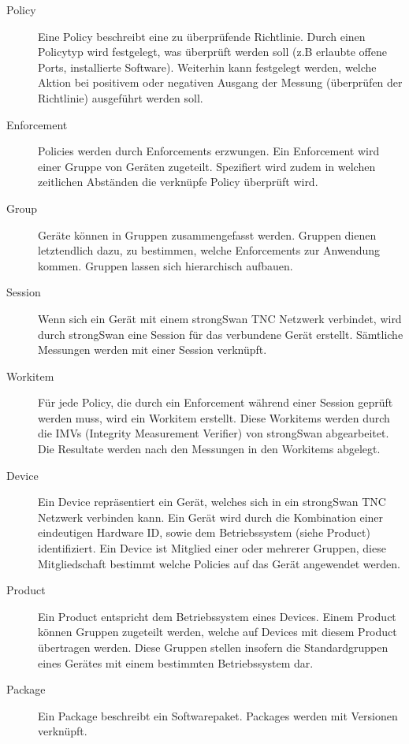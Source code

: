 \begin{description}
	\item[Policy] Eine Policy beschreibt eine zu überprüfende Richtlinie. Durch
	einen Policytyp wird festgelegt, was überprüft werden soll (z.B erlaubte offene
	Ports, installierte Software). Weiterhin kann festgelegt werden, welche Aktion
	bei positivem oder negativen Ausgang der Messung (überprüfen der Richtlinie)
	ausgeführt werden soll.
	
	\item[Enforcement] Policies werden durch Enforcements erzwungen. Ein
	Enforcement wird einer Gruppe von Geräten zugeteilt. Spezifiert wird zudem in
	welchen zeitlichen Abständen die verknüpfe Policy überprüft wird.

	\item[Group] Geräte können in Gruppen zusammengefasst werden. Gruppen dienen
	letztendlich dazu, zu bestimmen, welche Enforcements zur Anwendung kommen.
	Gruppen lassen sich hierarchisch aufbauen.

	\item[Session] Wenn sich ein Gerät mit einem strongSwan TNC Netzwerk verbindet,
	wird durch strongSwan eine Session für das verbundene Gerät erstellt. Sämtliche
	Messungen werden mit einer Session verknüpft.

	\item[Workitem] Für jede Policy, die durch ein Enforcement während einer
	Session geprüft werden muss, wird ein Workitem erstellt. Diese Workitems werden
	durch die IMVs (Integrity Measurement Verifier) von strongSwan abgearbeitet.
	Die Resultate werden nach den Messungen in den Workitems abgelegt.

	\item[Device] Ein Device repräsentiert ein Gerät, welches sich in ein
	strongSwan TNC Netzwerk verbinden kann. Ein Gerät wird durch die Kombination
	einer eindeutigen Hardware ID, sowie dem Betriebssystem (siehe Product)
	identifiziert. Ein Device ist Mitglied einer oder mehrerer Gruppen, diese
	Mitgliedschaft bestimmt welche Policies auf das Gerät angewendet werden.

	\item[Product] Ein Product entspricht dem Betriebssystem eines Devices. Einem
	Product können Gruppen zugeteilt werden, welche auf Devices mit
	diesem Product übertragen werden. Diese Gruppen stellen insofern die
	Standardgruppen eines Gerätes mit einem bestimmten Betriebssystem dar.

	\item[Package] Ein Package beschreibt ein Softwarepaket. Packages werden mit
	Versionen verknüpft.


\end{description}
